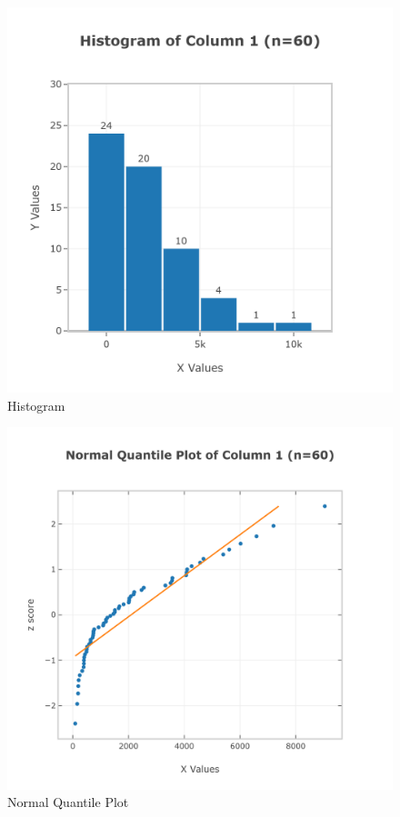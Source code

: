 \documentclass{article}
\begin{document}
\begin{enumerate}[label=(\alph*)]
          \begin{figure}[H]
              \centering
              \includegraphics[width=0.8\linewidth]{statdisk_histogram_q8.png}
              \caption{Histogram}
              \label{fig:histogram_q8}
          \end{figure}

          \begin{figure}[H]
              \centering
              \includegraphics[width=0.8\linewidth]{statdisk_normal_quantile_plot_q8.png}
              \caption{Normal Quantile Plot}
              \label{fig:normalquantile_q8}
          \end{figure}


\end{enumerate}
\end{document}
